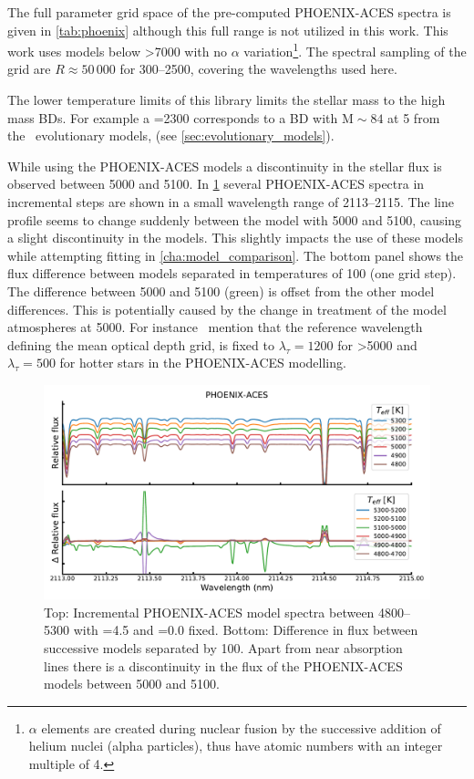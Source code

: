 The full parameter grid space of the pre-computed {PHOENIX-ACES} spectra is given in \cref{tab:phoenix} although this full range is not utilized in this work.
This work uses models below >7000\K{} with no \(\alpha\) variation\footnote{$\alpha$ elements are created during nuclear fusion by the successive addition of helium nuclei (alpha particles), thus have atomic numbers with an integer multiple of 4.}.
The spectral sampling of the grid are $R \approx 50\,000$ for 300--2500\nm{}, covering the wavelengths used here.



The lower temperature limits of this library limits the stellar mass to the high mass BDs.
For example a \Teff{}=2300\K{} corresponds to a {BD} with \(\textrm{M}\sim84\)\Mjup{} at 5\Gyr{} from the~\citet{baraffe_evolutionary_2003} evolutionary models, (see \cref{sec:evolutionary_models}).


While using the {PHOENIX-ACES} models a discontinuity in the stellar flux is observed between 5000\K{} and 5100\K{}.
In \cref{fig:phoenixdiffereceat5000k} several {PHOENIX-ACES} spectra in incremental steps are shown in a small wavelength range of 2113--2115\nm{}.
The line profile seems to change suddenly between the model with 5000\K{} and 5100\K{}, causing a slight discontinuity in the models.
This slightly impacts the use of these models while attempting \textchisquared{} fitting in \cref{cha:model_comparison}.
The bottom panel shows the flux difference between models separated in temperatures of 100\K{} (one grid step).
The difference between 5000 and 5100\K{} (green) is offset from the other model differences.
This is potentially caused by the change in treatment of the model atmospheres at 5000\K{}.
For instance~\citet{husser_new_2013} mention that the reference wavelength defining the mean optical depth grid, is fixed to $\lambda_{\tau}=1200$\nm{} for \Teff{}>5000\K{} and $\lambda_{\tau}=500$\nm{} for hotter stars in the {PHOENIX-ACES} modelling.

\begin{figure}
    \centering
    \includegraphics[width=0.7\linewidth]{figures/atmos_and_models/phoenix_differece_at_5000K}
    \caption[Difference in successive {PHOENIX-ACES} spectra around 5000\K.]{Top: Incremental {PHOENIX-ACES} model spectra between 4800--5300\K{} with \logg{}=4.5 and \feh{}=0.0 fixed.
    Bottom: Difference in flux between successive models separated by 100\K{}.
    Apart from near absorption lines there is a discontinuity in the flux of the {PHOENIX-ACES} models between 5000 and 5100\K{}.}
    \label{fig:phoenixdiffereceat5000k}
\end{figure}


